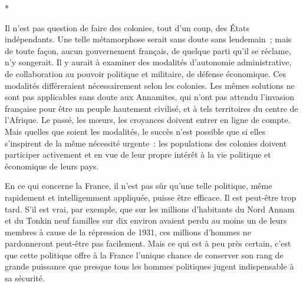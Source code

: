 \documentclass[french,twoside]{book} %
\begin{document}
\par

\begin{center}
\noindent \centerline{*}\par
\end{center}

\noindent Il n'est pas question de faire des colonies, tout d'un coup, des États indépendants. Une telle métamorphose serait sans doute sans lendemain ; mais de toute façon, aucun gouvernement français, de quelque parti qu'il se récla­me, n'y songerait. Il y aurait à examiner des modalités d'autonomie adminis­trative, de collaboration au pouvoir politique et militaire, de défense économique. Ces modalités différeraient nécessairement selon les colonies. Les mêmes solutions ne sont pas applicables sans doute aux Annamites, qui n'ont pas attendu l'invasion française pour être un peuple hautement civilisé, et à tels territoires du centre de l'Afrique. Le passé, les mœurs, les croyances doivent entrer en ligne de compte. Mais quelles que soient les modalités, le succès n'est possible que si elles s'inspirent de la même nécessité urgente : les populations des colonies doivent participer activement et en vue de leur propre intérêt à la vie politique et économique de leurs pays.\par
En ce qui concerne la France, il n'est pas sûr qu'une telle politique, même rapidement et intelligemment appliquée, puisse être efficace. Il est peut-être trop tard. S'il est vrai, par exemple, que sur les millions d'habitants du Nord Annam et du Tonkin neuf familles sur dix environ avaient perdu au moins un de leurs membres à cause de la répression de 1931, ces millions d'hommes ne pardonneront peut-être pas facilement. Mais ce qui est à peu près certain, c'est que cette politique offre à la France l'unique chance de conserver son rang de grande puissance que presque tous les hommes politiques jugent indispensable à sa sécurité.\par
\end{document}
